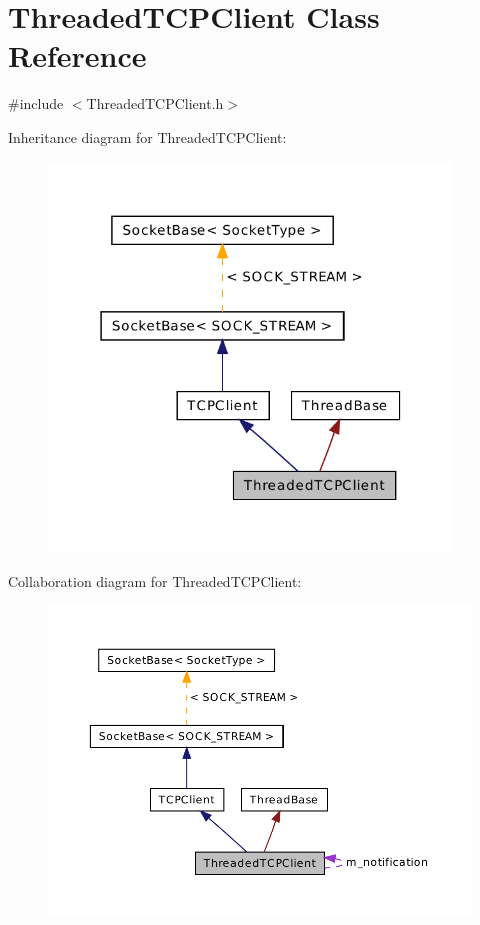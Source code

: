 \hypertarget{class_threaded_t_c_p_client}{\section{Threaded\-T\-C\-P\-Client Class Reference}
\label{class_threaded_t_c_p_client}
}


{\ttfamily \#include $<$Threaded\-T\-C\-P\-Client.\-h$>$}



Inheritance diagram for Threaded\-T\-C\-P\-Client\-:\nopagebreak
\begin{figure}[H]
\begin{center}
\leavevmode
\includegraphics[width=303pt]{class_threaded_t_c_p_client__inherit__graph}
\end{center}
\end{figure}


Collaboration diagram for Threaded\-T\-C\-P\-Client\-:\nopagebreak
\begin{figure}[H]
\begin{center}
\leavevmode
\includegraphics[width=350pt]{class_threaded_t_c_p_client__coll__graph}
\end{center}
\end{figure}
